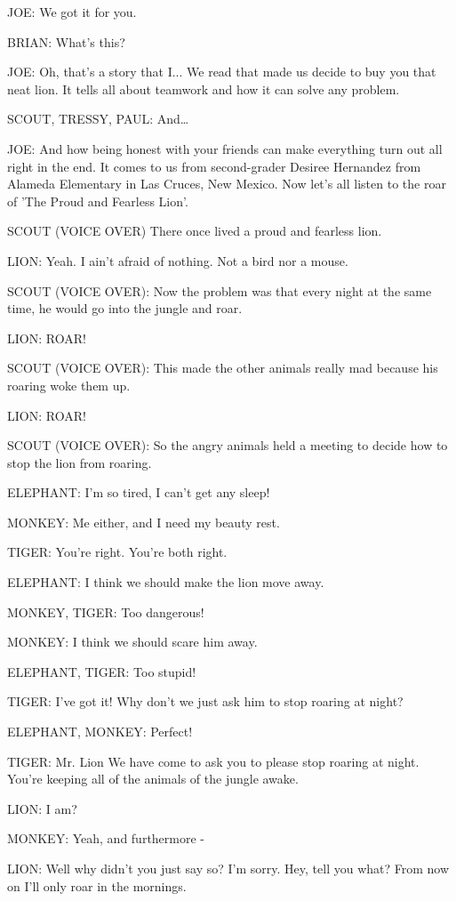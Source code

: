 JOE:
We got it for you.

BRIAN:
What's this?

JOE:
Oh, that's a story that I...
We read that made us decide to buy you that neat lion.
It tells all about teamwork and how it can solve any problem.

SCOUT, TRESSY, PAUL:
And\dots

JOE:
And how being honest with your friends can make everything turn out all right in the end.
It comes to us from second-grader Desiree Hernandez from Alameda Elementary in Las Cruces, New Mexico.
Now let's all listen to the roar of 'The Proud and Fearless Lion'.

SCOUT (VOICE OVER)
There once lived a proud and fearless lion.

LION:
Yeah.
I ain't afraid of nothing.
Not a bird nor a mouse.

SCOUT (VOICE OVER):
Now the problem was that every night at the same time, he would go into the jungle and roar.

LION:
ROAR!

SCOUT (VOICE OVER):
This made the other animals really mad because his roaring woke them up.

LION:
ROAR!

SCOUT (VOICE OVER):
So the angry animals held a meeting to decide how to stop the lion from roaring.

ELEPHANT:
I'm so tired, I can't get any sleep!

MONKEY:
Me either, and I need my beauty rest.

TIGER:
You're right.
You're both right.

ELEPHANT:
I think we should make the lion move away.

MONKEY, TIGER:
Too dangerous!

MONKEY:
I think we should scare him away.

ELEPHANT, TIGER:
Too stupid!

TIGER:
I've got it!
Why don't we just ask him to stop roaring at night?

ELEPHANT, MONKEY:
Perfect!

TIGER:
Mr. Lion
We have come to ask you to please stop roaring at night.
You're keeping all of the animals of the jungle awake.

LION:
I am?

MONKEY:
Yeah, and furthermore -

LION:
Well why didn't you just say so?
I'm sorry.
Hey, tell you what?
From now on I'll only roar in the mornings.

